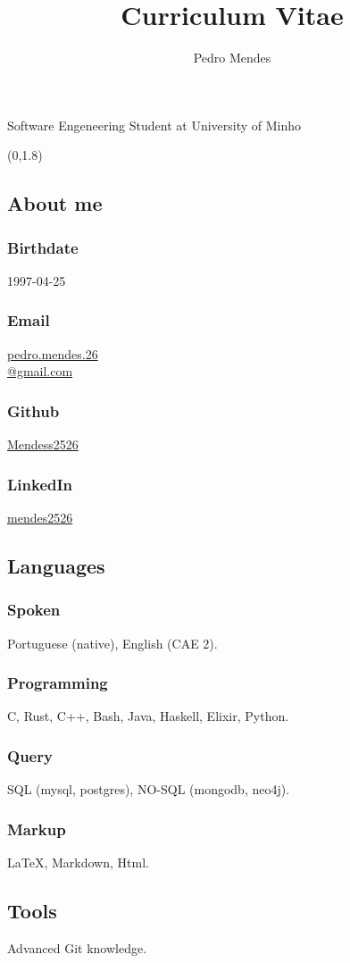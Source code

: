 \documentclass{article}
\renewcommand{\maketitle}{\begin{center}
        {\huge\bfseries\theauthor}

        \vspace{.25em}

        \Large{Software Engeneering Student at University of Minho}

        \vspace{.25em}

        \large{\thetitle}
    \end{center}
}
\begin{document}
\title{Curriculum Vitae}
\author{Pedro Mendes}

\maketitle

\begin{textblock}{2} (0,1.8)
    \begin{flushright}
        \subsection{\hfill About me}
        \subsubsection{\hfill Birthdate}
        1997-04-25
        \subsubsection{\hfill Email}
        \href{mailto:pedro.mendes.26@gmail.com}{pedro.mendes.26\\@gmail.com}
        \subsubsection{\hfill Github}
        \href{https://github.com/Mendess2526}{Mendess2526}
        \subsubsection{\hfill LinkedIn}
        \href{https://www.linkedin.com/in/mendes2526/}{mendes2526}

        \subsection{\hfill Languages}
        \subsubsection{\hfill Spoken}
        Portuguese (native), English (CAE 2).
        \subsubsection{\hfill Programming}
        C, Rust, C++, Bash, Java, Haskell, Elixir, Python.
        \subsubsection{\hfill Query}
        SQL (mysql, postgres), NO-SQL (mongodb, neo4j).
        \subsubsection{\hfill Markup}
        \LaTeX, Markdown, Html.
        \subsection{\hfill Tools}
        Advanced Git knowledge.
    \end{flushright}
\end{textblock}
\end{document}
